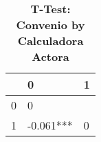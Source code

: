 \begin{table}[H]\centering \caption{\textbf{T-Test: Convenio by Calculadora Actora}}
\begin{tabular}{l*{2}{l}}
\toprule
                     & 0            & 1\\\midrule
0             &      0                   \\
1             & -0.061***    &      0    \\
\bottomrule\end{tabular}
\end{table}
